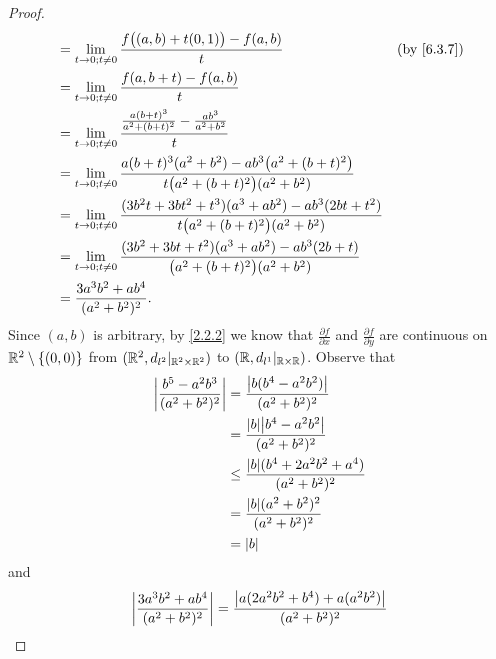\begin{proof}
\begin{align*}
     & = \lim_{t \to 0 ; t \neq 0} \frac{f\big((a, b) + t(0, 1)\big) - f(a, b)}{t}                                                             & \text{(by \cref{6.3.7})} \\
     & = \lim_{t \to 0 ; t \neq 0} \frac{f(a, b + t) - f(a, b)}{t}                                                                                                        \\
     & = \lim_{t \to 0 ; t \neq 0} \frac{\frac{a (b + t)^3}{a^2 + (b + t)^2} - \frac{ab^3}{a^2 + b^2}}{t}                                                                 \\
     & = \lim_{t \to 0 ; t \neq 0} \frac{a (b + t)^3 (a^2 + b^2) - a b^3 \big(a^2 + (b + t)^2\big)}{t \big(a^2 + (b + t)^2\big) (a^2 + b^2)}                              \\
     & = \lim_{t \to 0 ; t \neq 0} \frac{(3 b^2 t + 3 b t^2 + t^3) (a^3 + a b^2) - a b^3 (2bt + t^2)}{t \big(a^2 + (b + t)^2\big) (a^2 + b^2)}                            \\
     & = \lim_{t \to 0 ; t \neq 0} \frac{(3 b^2 + 3 b t + t^2) (a^3 + a b^2) - a b^3 (2b + t)}{\big(a^2 + (b + t)^2\big) (a^2 + b^2)}                                     \\
     & = \frac{3 a^3 b^2 + a b^4}{(a^2 + b^2)^2}.
  \end{align*}
  Since \((a, b)\) is arbitrary, by \cref{2.2.2} we know that \(\frac{\partial f}{\partial x}\) and \(\frac{\partial f}{\partial y}\) are continuous on \(\mathbb{R}^2 \setminus \{(0, 0)\}\) from \((\mathbb{R}^2, d_{l^2}|_{\mathbb{R}^2 \times \mathbb{R}^2})\) to \((\mathbb{R}, d_{l^1}|_{\mathbb{R} \times \mathbb{R}})\).
  Observe that
  \begin{align*}
    \abs{\frac{b^5 - a^2 b^3}{(a^2 + b^2)^2}} & = \frac{\abs{b (b^4 - a^2 b^2)}}{(a^2 + b^2)^2}            \\
                                              & = \frac{\abs{b} \abs{b^4 - a^2 b^2}}{(a^2 + b^2)^2}        \\
                                              & \leq \frac{\abs{b} (b^4 + 2 a^2 b^2 + a^4)}{(a^2 + b^2)^2} \\
                                              & = \frac{\abs{b} (a^2 + b^2)^2}{(a^2 + b^2)^2}              \\
                                              & = \abs{b}
  \end{align*}
  and
  \begin{align*}
    \abs{\frac{3 a^3 b^2 + a b^4}{(a^2 + b^2)^2}} & = \frac{\abs{a (2 a^2 b^2 + b^4) + a (a^2 b^2)}}{(a^2 + b^2)^2}                              \\

\end{align*}
\end{proof}
